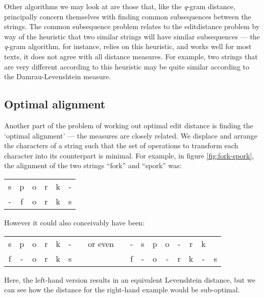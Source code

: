 Other algorithms we may look at are those that, like the
\textit{q}-gram distance, principally concern themselves with finding
common subsequences between the strings. The common subsequence
problem relates to the editdistance problem by way of the
heuristic that two similar strings will have similar subsequences ---
the \textit{q}-gram algorithm, for instance, relies on this heuristic,
and works well for most texts, it does not agree with all distance
measures. For example, two strings that are very different according
to this heuristic may be quite similar according to the
Damrau-Levenshtein measure.

\subsection*{Optimal alignment}
Another part of the problem of working out optimal edit distance is
finding the `optimal alignment' --- the measures are closely
related. We displace and arrange the characters of a string such that
the set of operations to transform each character into its counterpart
is minimal. For example, in figure \ref{fig:fork-spork}, the alignment
of the two strings ``fork'' and ``spork'' was:

\begin{center}
  \begin{tabular}{cccccc}
    s & p & o & r & k & -\\
    - & f & o & r & k & s 
  \end{tabular}
\end{center}

However it could also conceivably have been:

\begin{center}
  \begin{tabular}{ccccccccccccccccc}
    s & p & o & r & k & - & & or even & & - & s & p & o & - & r & k &\\
    f & - & o & r & k & s & &         & & f & - & o & - & r & k & - & s    
  \end{tabular}
\end{center}

Here, the left-hand version results in an equivalent
Levenshtein distance, but we can see how the distance for the
right-hand example would be sub-optimal.

